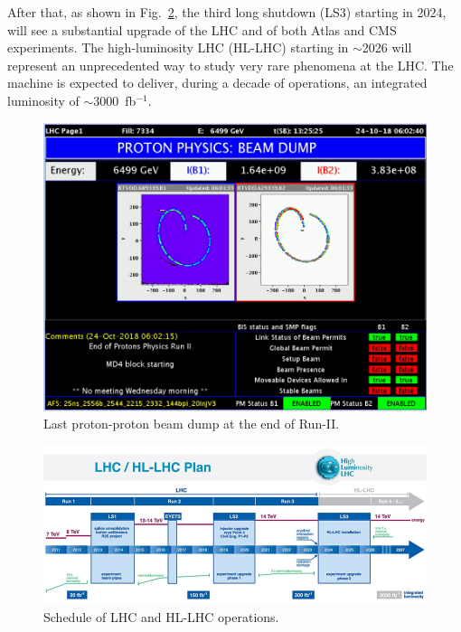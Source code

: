 After that,  as shown in Fig.~\ref{lhcplan}, the third long shutdown (LS3) starting in 2024, will see a
substantial upgrade of the LHC and of both Atlas and CMS experiments.
The high-luminosity LHC (HL-LHC) starting in $\sim$2026
will represent an unprecedented way to study very rare phenomena at the LHC. The
machine is expected to deliver, during a decade of operations, an integrated luminosity
of $\sim$3000~fb$^{-1}$.
\begin{figure}
\centering
\includegraphics[scale= 0.2]{../Cap2/beam}
\caption{Last proton-proton beam dump at the end of Run-II.}
\label{beam}
\end{figure}
\begin{figure}
\centering
\includegraphics[scale= 0.5]{../Cap2/lhcplan}
\caption{Schedule of LHC and HL-LHC operations.}
\label{lhcplan}
\end{figure}






